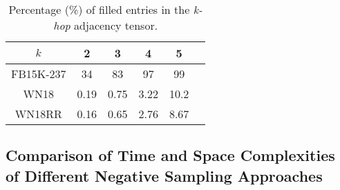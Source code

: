 \begin{table}[b]
\begin{small}
\centering
\begin{tabular}{cccccc}
\hline
$k$ & 2 & 3 & 4 & 5 \\ 
\hline
FB15K-237 & 34 & 83 & 97 & 99 \\
\hline
WN18 & 0.19 & 0.75 & 3.22 & 10.2 \\
\hline
WN18RR & 0.16 & 0.65 & 2.76 & 8.67 \\
\hline
\end{tabular}
\caption{Percentage (\%) of filled entries in the \emph{k-hop} adjacency tensor.}
\label{tab:percentage}
\end{small}
\end{table}


\subsection{Comparison of Time and Space Complexities of Different Negative Sampling Approaches}

